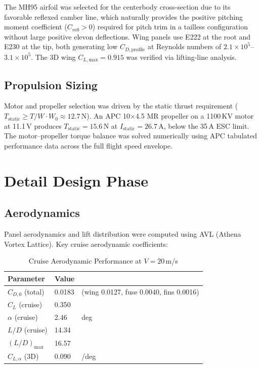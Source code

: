 \documentclass[10pt]{article}
\begin{document}
The MH95 airfoil was selected for the centerbody cross-section due to its
favorable reflexed camber line, which naturally provides the positive pitching
moment coefficient ($C_{m0} > 0$) required for pitch trim in a tailless
configuration without large positive elevon deflections.
Wing panels use E222 at the root and E230 at the tip,
both generating low $C_{D,\text{profile}}$ at Reynolds numbers of
$2.1 \times 10^5$--$3.1 \times 10^5$.
The 3D wing $C_{L,\text{max}} = 0.915$ was verified via lifting-line analysis.

\subsection{Propulsion Sizing}

Motor and propeller selection was driven by the static thrust requirement
($T_{\text{static}} \geq T/W \cdot W_0 \approx 12.7$\,N).
An APC 10$\times$4.5 MR propeller on a 1100\,KV motor at 11.1\,V produces
$T_{\text{static}} = 15.6$\,N at $I_{\text{static}} = 26.7$\,A,
below the 35\,A ESC limit.
The motor--propeller torque balance was solved numerically using APC tabulated
performance data across the full flight speed envelope.

\section{Detail Design Phase}

\subsection{Aerodynamics}

Panel aerodynamics and lift distribution were computed using AVL (Athena Vortex
Lattice). Key cruise aerodynamic coefficients:

\begin{table}[H]
\centering
\caption{Cruise Aerodynamic Performance at $V = 20$\,m/s}
\small
\begin{tabular}{lll}
\toprule
Parameter & Value & \\
\midrule
$C_{D,0}$ (total) & 0.0183 & (wing 0.0127, fuse 0.0040, fins 0.0016) \\
$C_L$ (cruise) & 0.350 & \\
$\alpha$ (cruise) & 2.46 & deg \\
$L/D$ (cruise) & 14.34 & \\
$(L/D)_{\text{max}}$ & 16.57 & \\
$C_{L,\alpha}$ (3D) & 0.090 & /deg \\
\bottomrule
\end{tabular}
\end{table}
\end{document}
